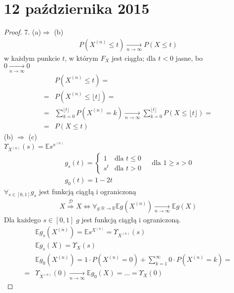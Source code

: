 \chapter{12 października 2015}
\begin{proof}
7. (a)$ \Rightarrow $ (b)
\begin{gather*}
P\left(X^{(n)}\le t\right)\xrightarrow[n\to \infty ]{}P\left(X\le t\right)
\end{gather*}
w każdym punkcie $ t $, w którym $ F_X $ jest ciągła; dla $ t<0 $ jasne, bo \\$ 0\xrightarrow[n\to \infty ]{}0 $
\begin{align*}
&P\left(X^{(n)}\le t\right)
=\\=&
P\left(X^{(n)}\le \lfloor t\rfloor\right)
=\\=&
\sum_{k=0}^{\lfloor t\rfloor}P\left(X^{(n)}=k\right)
\xrightarrow[n\to \infty ]{}
\sum_{k=0}^{\lfloor t\rfloor}P\left(X\le\lfloor t\rfloor\right)
=\\=&
P\left(X\le t\right)
\end{align*}
(b) $ \Rightarrow $ (c)\\
$ \Upsilon_{X^{(n)}}(s)=\mathbb E s^{x^{(n)}} $
\begin{gather*}
g_s(t)=\left \{
\begin{array}{lll}
	1   & \text{dla } t\le0 &  \\
	s^t & \text{dla } t>0   &
\end{array}
\right .
\text{ dla } 1\ge s>0\\
g_0(t)=1-2t
\end{gather*}
$ \forall_{s\in[0,1]} g_s$ jest funkcją ciągłą i ograniczoną\\
\begin{gather*}
X\overset{\mathcal D}{\Rightarrow}X\Leftrightarrow\forall_{g:\mathbb R \to \mathbb R }\mathbb E g\left(X^{(n)}\right) \xrightarrow[n\to\infty ]{}\mathbb E g(X)
\end{gather*}
Dla każdego $ s\in[0,1] \; g$ jest funkcją ciągłą i ograniczoną.
\begin{align*}
&\mathbb E g_s\left(X^{(n)}\right)
=\mathbb E s^{X^{(n)}}
=\Upsilon_{X^{(n)}}(s)\\
&\mathbb E g_s\left(X\right)
=\Upsilon_{X}(s)\\
&\mathbb E g_0\left(X^{(n)}\right)
=
1\cdot P\left(X^{(n)}=0\right)+\sum_{k=1}^{\infty }0\cdot P\left(X^{(n)}=k\right)
=\\=&
\Upsilon_{X^{(n)}}(0)\xrightarrow[n\to\infty ]{}\mathbb E g_0(X)=\dots=\Upsilon_X(0)
\end{align*}

\end{proof}
